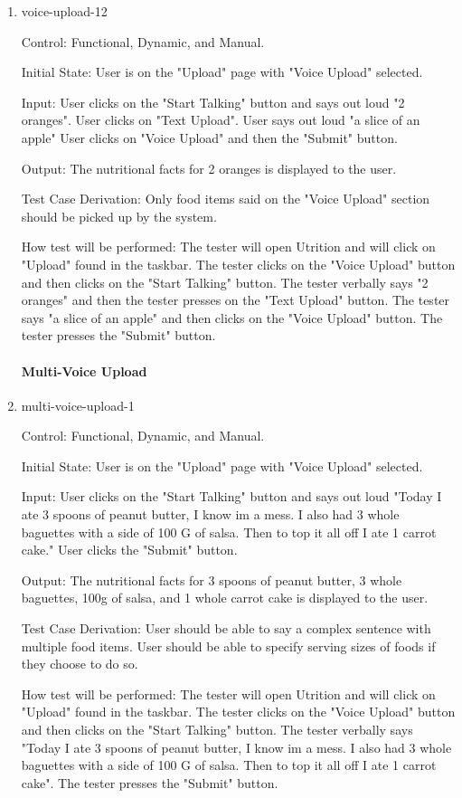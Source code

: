 \documentclass[12pt, titlepage]{article}
\begin{document}
\begin{enumerate}
	\item{voice-upload-12\\}
	
	Control: Functional, Dynamic, and Manual.
	
	Initial State: User is on the "Upload" page with "Voice Upload" selected.
	
	Input: User clicks on the "Start Talking" button and says out loud "2 oranges". User clicks on "Text Upload". User says out loud "a slice of an apple" User clicks on "Voice Upload" and then the "Submit" button.
	
	Output: The nutritional facts for 2 oranges is displayed to the user.
	
	Test Case Derivation: Only food items said on the "Voice Upload" section should be picked up by the system.
	
	How test will be performed: The tester will open Utrition and will click on "Upload" found in the taskbar. The tester clicks on the "Voice Upload" button and then clicks on the "Start Talking" button. The tester verbally says "2 oranges" and then the tester presses on the "Text Upload" button. The tester says "a slice of an apple" and then clicks on the "Voice Upload" button. The tester presses the "Submit" button.
	
		\paragraph{Multi-Voice Upload}
	\item{multi-voice-upload-1\\}
	
	Control: Functional, Dynamic, and Manual.
	
	Initial State: User is on the "Upload" page with "Voice Upload" selected.
	
	Input: User clicks on the "Start Talking" button and says out loud "Today I ate 3 spoons of peanut butter, I know im a mess. I also had 3 whole baguettes with a side of 100 G of salsa. Then to top it all off I ate 1 carrot cake." User clicks the "Submit" button.
	
	Output: The nutritional facts for 3 spoons of peanut butter, 3 whole baguettes, 100g of salsa, and 1 whole carrot cake is displayed to the user.
	
	Test Case Derivation: User should be able to say a complex sentence with multiple food items. User should be able to specify serving sizes of foods if they choose to do so.
	
	How test will be performed: The tester will open Utrition and will click on "Upload" found in the taskbar. The tester clicks on the "Voice Upload" button and then clicks on the "Start Talking" button. The tester verbally says "Today I ate 3 spoons of peanut butter, I know im a mess. I also had 3 whole baguettes with a side of 100 G of salsa. Then to top it all off I ate 1 carrot cake". The tester presses the "Submit" button.
	

\end{enumerate}
\end{document}
